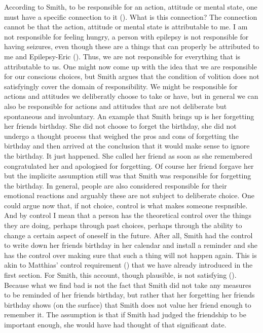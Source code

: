 \documentclass{article}
\newcounter{example}[section]
\begin{document}
 According to Smith, to be responsible for an action, attitude or mental state,
 one must have a specific connection to it
 (\cite[p 370]{smith2008control}). What is this connection? The connection
 cannot be that the action, attitude or mental state is attributable to me. I am
 not responsible for feeling hungry, a person with epilepsy is not responsible
 for having seizures, even though these are a things that can
 properly be attributed to me and Epilepsy-Eric (\cite[p.
 584]{smith2012attributability}). Thus, we are not responsible for everything
 that is attributable to us. One might now come up with the idea that we are
 responsible for our conscious choices, but Smith argues that the condition of
 volition does not satisfyingly cover the domain of responsibility.  We might be
 responsible for actions and attitudes we deliberatly choose to take or have,
 but in general we can also be responsible for actions and attitudes that are
 not deliberate but spontaneous and involuntary. An example that Smith brings up
 is her forgetting her friends birthday. She did not choose to forget the
 birthday, she did not undergo a thought process that weighed the pros and cons
 of forgetting the birthday and then arrived at the conclusion that it would
 make sense to ignore the birthday. It just happened. She called her friend as
 soon as she remembered congratulated her and apologised for forgetting. Of
 course her friend forgave her but the implicite assumption still was that
 Smith was responsible for forgetting the birthday. In general, people are also
 considered responsible for their emotional reactions and arguably these are not
 subject to deliberate choice. One could argue now that, if not choice, control
 is what makes someone respnsible. And by control I mean that a person has the
 theoretical control over the things they are doing, perhaps through past
 choices, perhaps through the ability to change a certain aspect of oneself in
 the future. After all, Smith had the control to write down her friends birthday
 in her calendar and install a reminder and she has the control over making sure
 that such a thing will not happen again. This is akin to Matthias' control
 requirement (\cite[p.175]{Matthias_2004}) that we have already introduced in
 the first section. For Smith, this account, though plausible, is not satisfying
 (\cite[p. 251]{smith2005responsibility}). Because what we find bad is not the
 fact that Smith did not take any measures to be reminded of her friends birthday,
 but rather that her forgetting her friends birthday shows (on the surface) that
 Smith does not value her friend enough to remember it. The assumption is that
 if Smith had judged the friendship to be important enough, she would have had
 thought of that significant date.
\end{document}
